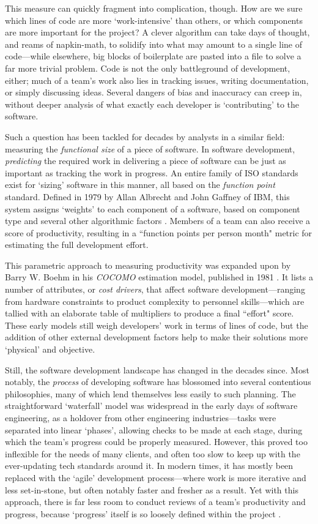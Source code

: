 \documentclass[12pt]{article}
\begin{document}
	This measure can quickly fragment into complication, though. How are we sure which lines of code are more `work-intensive' than others, or which components are more important for the project? A clever algorithm can take days of thought, and reams of napkin-math, to solidify into what may amount to a single line of code---while elsewhere, big blocks of boilerplate are pasted into a file to solve a far more trivial problem. Code is not the only battleground of development, either; much of a team's work also lies in tracking issues, writing documentation, or simply discussing ideas. Several dangers of bias and inaccuracy can creep in, without deeper analysis of what exactly each developer is `contributing' to the software.
	
	Such a question has been tackled for decades by analysts in a similar field: measuring the \textit{functional size} of a piece of software. In software development, \textit{predicting} the required work in delivering a piece of software can be just as important as tracking the work in progress. An entire family of ISO standards exist for `sizing' software in this manner, all based on the \textit{function point} standard. Defined in 1979 by Allan Albrecht and John Gaffney of IBM, this system assigns `weights' to each component of a software, based on component type and several other algorithmic factors \cite{stutzke}. Members of a team can also receive a score of productivity, resulting in a ``function points per person month" metric for estimating the full development effort.
	
	This parametric approach to measuring productivity was expanded upon by Barry W. Boehm in his \textit{COCOMO} estimation model, published in 1981 \cite{stutzke}. It lists a number of attributes, or \textit{cost drivers}, that affect software development---ranging from hardware constraints to product complexity to personnel skills---which are tallied with an elaborate table of multipliers to produce a final ``effort" score. These early models still weigh developers' work in terms of lines of code, but the addition of other external development factors help to make their solutions more `physical' and objective.
	
	Still, the software development landscape has changed in the decades since. Most notably, the \textit{process} of developing software has blossomed into several contentious philosophies, many of which lend themselves less easily to such planning. The straightforward `waterfall' model was widespread in the early days of software engineering, as a holdover from other engineering industries---tasks were separated into linear `phases', allowing checks to be made at each stage, during which the team's progress could be properly measured. However, this proved too inflexible for the needs of many clients, and often too slow to keep up with the ever-updating tech standards around it. In modern times, it has mostly been replaced with the `agile' development process---where work is more iterative and less set-in-stone, but often notably faster and fresher as a result. Yet with this approach, there is far less room to conduct reviews of a team's productivity and progress, because `progress' itself is so loosely defined within the project \cite{agile}.
	
\end{document}
